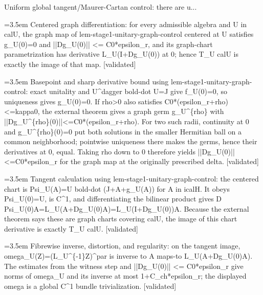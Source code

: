 \documentclass{article}
\newcommand{\step}[1]{\par\noindent\hangindent=3.5em\hangafter=1%
  \makebox[3.5em][l]{\textbf{#1.}}}
\newcommand{\steptag}[1]{\hfill{\small\textsf{[#1]}}}
\begin{document}
\begin{proofbox}{Uniform global tangent/Maurer-Cartan control: there are u...}
\step{1.2} Centered graph differentiation: for every admissible algebra and U in calU, the graph map of lem-stage1-unitary-graph-control centered at U satisfies g\_U(0)=0 and ||Dg\_U(0)|| <= C0*epsilon\_r, and its graph-chart parametrization has derivative L\_U(I+Dg\_U(0)) at 0; hence T\_U calU is exactly the image of that map. \steptag{validated} \\[6pt]
\step{1.2.1} Basepoint and sharp derivative bound using lem-stage1-unitary-graph-control: exact unitality and U\textasciicircum{}dagger bold-dot U=J give f\_U(0)=0, so uniqueness gives g\_U(0)=0. If rho>0 also satisfies C0*(epsilon\_r+rho)<=kappa0, the external theorem gives a graph germ g\_U\textasciicircum{}\{rho\} with ||Dg\_U\textasciicircum{}\{rho\}(0)||<=C0*(epsilon\_r+rho). For two such radii, continuity at 0 and g\_U\textasciicircum{}\{rho\}(0)=0 put both solutions in the smaller Hermitian ball on a common neighborhood; pointwise uniqueness there makes the germs, hence their derivatives at 0, equal. Taking rho down to 0 therefore yields ||Dg\_U(0)||<=C0*epsilon\_r for the graph map at the originally prescribed delta. \steptag{validated} \\[4pt]
\step{1.2.2} Tangent calculation using lem-stage1-unitary-graph-control: the centered chart is Psi\_U(A)=U bold-dot (J+A+g\_U(A)) for A in icalH. It obeys Psi\_U(0)=U, is C\textasciicircum{}1, and differentiating the bilinear product gives D Psi\_U(0)A=L\_U(A+Dg\_U(0)A)=L\_U(I+Dg\_U(0))A. Because the external theorem says these are graph charts covering calU, the image of this chart derivative is exactly T\_U calU. \steptag{validated} \\[4pt]
\step{1.3} Fibrewise inverse, distortion, and regularity: on the tangent image, omega\_U(Z)=(L\_U\textasciicircum{}\{-1\}Z)\textasciicircum{}par is inverse to A maps-to L\_U(A+Dg\_U(0)A). The estimates from the witness step and ||Dg\_U(0)|| <= C0*epsilon\_r give norms of omega\_U and its inverse at most 1+C\_ch*epsilon\_r; the displayed omega is a global C\textasciicircum{}1 bundle trivialization. \steptag{validated} \\[6pt]

\end{proofbox}
\end{document}
